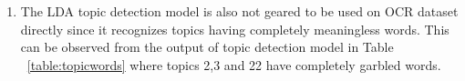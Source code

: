 \begin{enumerate}
\item
The LDA topic detection model is also not geared to be used on OCR dataset directly since it recognizes topics having completely meaningless words. This can be observed from the output of topic detection model in Table ~\ref{table:topicwords} where topics 2,3 and 22 have completely garbled words.

\end{enumerate}